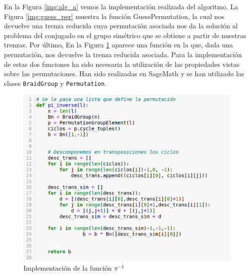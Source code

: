 \documentclass[12pt]{book}
\theoremstyle{definition}
\begin{document}
En la Figura \ref{img:alg_a} vemos la implementación realizada del algoritmo. La Figura \ref{img:guess_per} muestra la función GuessPermutation, la cual nos devuelve una trenza reducida cuya permutación asociada nos da la solución al problema del conjugado en el grupo simétrico que se obtiene a partir de nuestras trenzas. Por último, En la Figura \ref{img:pi_inverse} aparece una función en la que, dada una permutación, nos devuelve la trenza reducida asociada. Para la implementación de estas dos funciones ha sido necesaria la utilización de las propiedades vistas sobre las permutaciones. Han sido realizadas en SageMath y se han utilizado las clases \texttt{BraidGroup} y \texttt{Permutation}.


\begin{figure}[]
\centering
\includegraphics[scale=0.5]{imgs/pi_inverse.png} 
\caption{Implementación de la función $\pi^{-1}$}
\label{img:pi_inverse}
\end{figure}
\end{document}
